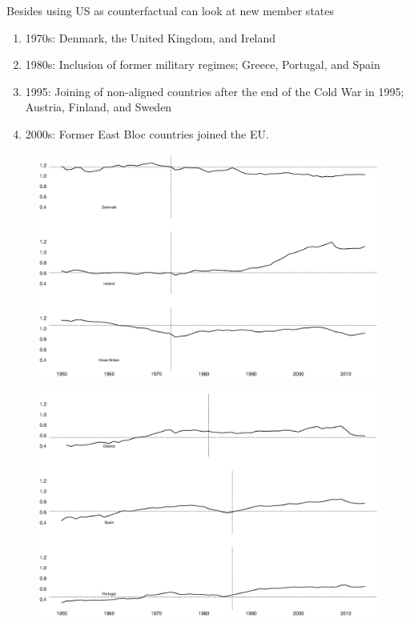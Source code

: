 \documentclass{beamer}
\begin{document}
\begin{frame}
  Besides using US as counterfactual can look at new member states
  \begin{enumerate}
  \item 1970s: Denmark, the United Kingdom, and Ireland 
  \item 1980s: Inclusion of former military regimes; Greece, Portugal, and Spain
  \item 1995: Joining of non-aligned countries after the end of the Cold War in 1995; Austria, Finland, and Sweden
  \item 2000s: Former East Bloc countries joined the EU. 
\end{enumerate} 
\end{frame}

\begin{frame}
  \begin{figure}
    \includegraphics[scale=.3]{enlargement1.eps}
  \end{figure}
\end{frame}

\begin{frame}
  \begin{figure}
    \includegraphics[scale=.3]{enlargement2.eps}
  \end{figure}
\end{frame}
\end{document}
